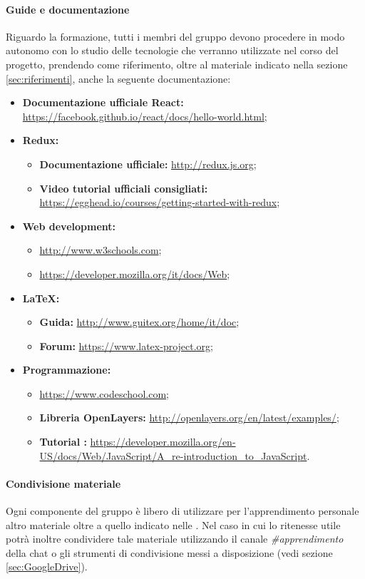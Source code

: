 	\paragraph{Guide e documentazione} \label{sec:guidalatex}
	Riguardo la formazione, tutti i membri del gruppo devono procedere in modo autonomo con lo studio delle tecnologie che verranno utilizzate nel corso del progetto, prendendo come riferimento, oltre al materiale indicato nella sezione \ref{sec:riferimenti}, anche la seguente documentazione:
	\begin{itemize}
		\item \textbf{Documentazione ufficiale React:} \url{https://facebook.github.io/react/docs/hello-world.html};
		\item \textbf{Redux:}
			\begin{itemize}
				\item \textbf{Documentazione ufficiale:} \url{http://redux.js.org};
				\item \textbf{Video tutorial ufficiali consigliati:} \url{https://egghead.io/courses/getting-started-with-redux};
			\end{itemize}
		\item \textbf{Web development:}
			\begin{itemize}
				\item \url{http://www.w3schools.com};
				\item \url{https://developer.mozilla.org/it/docs/Web};
			\end{itemize}
		\item \textbf{\LaTeX:}
			\begin{itemize}
				\item \textbf{Guida:} \url{http://www.guitex.org/home/it/doc};
				\item \textbf{Forum:} \url{https://www.latex-project.org};
			\end{itemize}
		\item \textbf{Programmazione:} 
			\begin{itemize}
				\item \url{https://www.codeschool.com};
				\item \textbf{Libreria OpenLayers:} \url{http://openlayers.org/en/latest/examples/};
				\item \textbf{Tutorial \js:} \url{https://developer.mozilla.org/en-US/docs/Web/JavaScript/A_re-introduction_to_JavaScript}.
			\end{itemize}
	\end{itemize}
	\paragraph{Condivisione materiale} \label{sec:condMateriale}
	Ogni componente del gruppo è libero di utilizzare per l'apprendimento personale altro materiale oltre a quello indicato nelle \ndp. Nel caso in cui lo ritenesse utile potrà inoltre condividere tale materiale utilizzando il canale \textit{\#apprendimento} della chat o gli strumenti di condivisione messi a disposizione (vedi sezione \ref{sec:GoogleDrive}).
